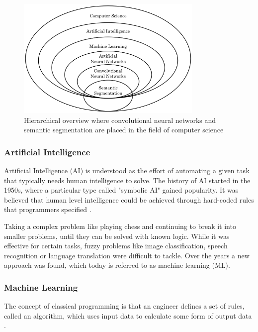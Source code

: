 \begin{figure}[H]
\centering
\par
\includegraphics[width=0.8\textwidth]{imgs/cs_hier.png}
\caption{Hierarchical overview where convolutional neural networks and semantic segmentation are placed in the field of computer science}
\par
\end{figure}

\subsubsection{Artificial Intelligence}

Artificial Intelligence (AI) is understood as the effort of automating a given task that typically needs human intelligence to solve. The history of AI started in the 1950s, where a particular type called "symbolic AI" gained popularity. It was believed that human level intelligence could be achieved through hard-coded rules that programmers specified \cite{Chollet2017}. 

Taking a complex problem like playing chess and continuing to break it into smaller problems, until they can be solved with known logic. While it was effective for certain tasks, fuzzy problems like image classification, speech recognition or language translation were difficult to tackle. Over the years a new approach was found, which today is referred to as machine learning (ML).

\subsubsection{Machine Learning}

The concept of classical programming is that an engineer defines a set of rules, called an algorithm, which uses input data to calculate some form of output data \cite{Chollet2017}.


